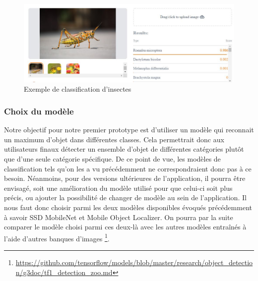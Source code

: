 \documentclass[UTF8]{EPURapport}
\begin{document}
\begin{figure}[h!]
\centering
  \includegraphics[width=\textwidth]{images/insects_classification.jpg}
  \caption{Exemple de classification d'insectes}
  \label{fig:insectsclassification}
\end{figure}

\subsubsection{Choix du modèle} \label{choixmodele}
Notre objectif pour notre premier prototype est d'utiliser un modèle qui reconnait un maximum d'objet dans différentes classes. Cela permettrait donc aux utilisateurs finaux détecter un ensemble d'objet de différentes catégories plutôt que d'une seule catégorie spécifique. De ce point de vue, les modèles de classification tels qu'on les a vu précédemment ne correspondraient donc pas à ce besoin. Néanmoins, pour des versions ultérieures de l'application, il pourra être envisagé, soit une amélioration du modèle utilisé pour que celui-ci soit plus précis, ou ajouter la possibilité de changer de modèle au sein de l'application. Il nous faut donc choisir parmi les deux modèles disponibles évoqués précédemment à savoir SSD MobileNet et Mobile Object Localizer. On pourra par la suite comparer le modèle choisi parmi ces deux-là avec les autres modèles entraînés à l'aide d'autres banques d'images \footnote{\url{https://github.com/tensorflow/models/blob/master/research/object_detection/g3doc/tf1_detection_zoo.md}}. \\
\end{document}
